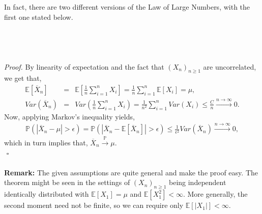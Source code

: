 \documentclass{article}
\begin{document}
In fact, there are two different versions of the Law of Large Numbers, with the first one stated below.\\\\
\noindent{}\\\\\\
\textit{Proof.} By linearity of expectation and the fact that $(X_n)_{n\geq1}$ are uncorrelated, we get that,
\begin{eqnarray}
\nonumber
\mathbb{E}[\overline{X}_n] &=& \mathbb{E}\left[\frac{1}{n}\sum_{i=1}^{n}X_i\right] = \frac{1}{n}\sum_{i=1}^{n}\mathbb{E}[X_i] = \mu,\\
\nonumber
Var(\overline{X}_n) &=& Var\left(\frac{1}{n}\sum_{i=1}^{n}X_i\right) = \frac{1}{n^2}\sum_{i=1}^{n}Var(X_i) \leq \frac{C}{n} \xrightarrow{n\to\infty} 0.
\end{eqnarray}
Now, applying Markov's inequality yields,
\begin{eqnarray}
\nonumber
\mathbb{P}(|\overline{X}_n - \mu| > \epsilon) = \mathbb{P}(|\overline{X}_n - \mathbb{E}[\overline{X}_n]| > \epsilon) \leq \frac{1}{\epsilon^2}Var({\overline{X}_n}) \xrightarrow{n\to\infty} 0,
\end{eqnarray}
which in turn implies that, $\overline{X}_n \xrightarrow{\mathbb{P}} \mu$.\\
${}$ \hfill $\square$ \\\\
\textbf{Remark:} The given assumptions are quite general and make the proof easy. The theorem might be seen in the settings of $(X_n)_{n\geq1}$ being independent identically distributed with $\mathbb{E}[X_1] = \mu$ and $\mathbb{E}[X_1^2] < \infty$. More generally, the second moment need not be finite, so we can require only $\mathbb{E}[|X_1|] < \infty$.\\\\
\end{document}
